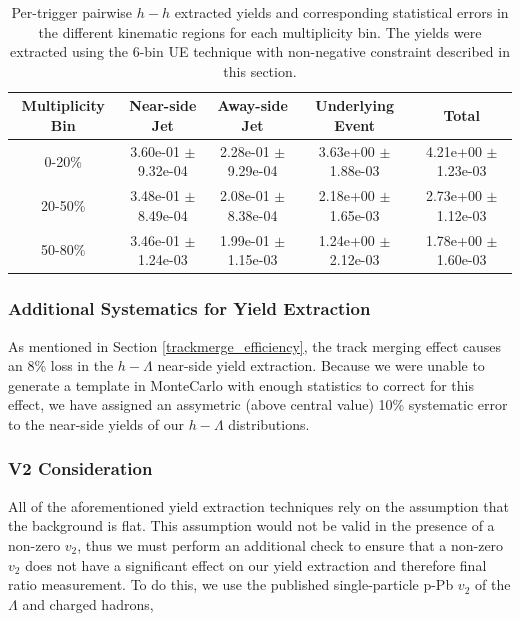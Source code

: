 \documentclass[ALICE,manyauthors]{ALICE_analysis_notes}
\begin{document}
\begin{table}[h!]
\centering
\begin{tabular}{| c | c | c | c | c | }
\hline
Multiplicity Bin & Near-side Jet & Away-side Jet & Underlying Event & Total  \\
\hline

0-20\% & 3.60e-01 $\pm$ 9.32e-04 & 2.28e-01 $\pm$ 9.29e-04 & 3.63e+00 $\pm$ 1.88e-03 & 4.21e+00 $\pm$ 1.23e-03 \\
20-50\% & 3.48e-01 $\pm$ 8.49e-04 & 2.08e-01 $\pm$ 8.38e-04 & 2.18e+00 $\pm$ 1.65e-03 & 2.73e+00 $\pm$ 1.12e-03 \\
50-80\% & 3.46e-01 $\pm$ 1.24e-03 & 1.99e-01 $\pm$ 1.15e-03 & 1.24e+00 $\pm$ 2.12e-03 & 1.78e+00 $\pm$ 1.60e-03 \\

\hline
\end{tabular}
\caption{Per-trigger pairwise $h-h$ extracted yields and corresponding statistical errors in the different kinematic regions for each multiplicity bin. The yields were extracted using the 6-bin UE technique with non-negative constraint described in this section.}
\label{h_h_yield_table_6bin_nonzero}
\end{table}

\subsubsection{Additional Systematics for Yield Extraction}
As mentioned in Section \ref{trackmerge_efficiency}, the track merging effect causes an 8\% loss in the $h-\Lambda$ near-side yield extraction. Because we were unable to generate a template in MonteCarlo with enough statistics to correct for this effect, we have assigned an assymetric (above central value) 10\% systematic error to the near-side yields of our $h-\Lambda$ distributions.

\subsubsection{V2 Consideration}
All of the aforementioned yield extraction techniques rely on the assumption that the background is flat. This assumption would not be valid in the presence of a non-zero $v_{2}$, thus we must perform an additional check to ensure that a non-zero $v_{2}$ does not have a significant effect on our yield extraction and therefore final ratio measurement. To do this, we use the published single-particle p-Pb $v_{2}$ of the $\Lambda$ and charged hadrons,
\end{document}
